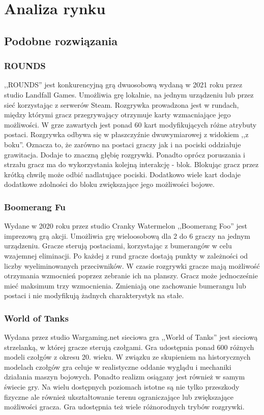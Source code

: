 \chapter{Analiza rynku}\label{ch:market}
\section{Podobne rozwiązania}

\subsection{ROUNDS}
,,ROUNDS'' jest konkurencyjną grą dwuosobową wydaną w 2021 roku przez studio Landfall Games\cite{rounds}. Umożliwia grę lokalnie, na jednym urządzeniu lub przez sieć korzystając z serwerów Steam. Rozgrywka prowadzona jest w rundach, między którymi gracz przegrywający otrzymuje karty wzmacniające jego możliwości. W grze zawartych jest ponad 60 kart modyfikujących różne atrybuty postaci. Rozgrywka odbywa się w płaszczyźnie dwuwymiarowej z widokiem ,,z boku''. Oznacza to, że zarówno na postaci graczy jak i na pociski oddziałuje grawitacja. Dodaje to znaczną głębię rozgrywki. Ponadto oprócz poruszania i strzału gracz ma do wykorzystania kolejną interakcję - blok. Blokując gracz przez krótką chwilę może odbić nadlatujące pociski. Dodatkowo wiele kart dodaje dodatkowe zdolności do bloku zwiększające jego możliwości bojowe.

\subsection{Boomerang Fu}
Wydane w 2020 roku przez studio Cranky Watermelon ,,Boomerang Foo'' jest imprezową grą akcji\cite{boomerang_fu}. Umożliwia grę wieloosobową dla 2 do 6 graczy na jednym urządzeniu. Gracze sterują postaciami, korzystając z bumerangów w celu wzajemnej eliminacji. Po każdej z rund gracze dostają punkty w zależności od liczby wyeliminowanych przeciwników. W czasie rozgrywki gracze mają możliwość otrzymania wzmocnień poprzez zebranie ich na planszy. Gracz może jednocześnie mieć maksimum trzy wzmocnienia. Zmieniają one zachowanie bumerangu lub postaci i nie modyfikują żadnych charakterystyk na stałe.

\subsection{World of Tanks}
Wydana przez studio Wargaming.net sieciowa gra ,,World of Tanks'' jest sieciową strzelanką, w której gracze sterują czołgami\cite{worldoftanks}. Gra udostępnia ponad 600 różnych modeli czołgów z okresu 20. wieku. W związku ze skupieniem na historycznych modelach czołgów gra celuje w realistyczne oddanie wyglądu i mechaniki działania maszyn bojowych. Ponadto realizm osiągany jest również w samym świecie gry. Na wielu dostępnych poziomach istotne są nie tylko przeszkody fizyczne ale również ukształtowanie terenu ograniczające lub zwiększające możliwości gracza. Gra udostępnia też wiele różnorodnych trybów rozgrywki.


